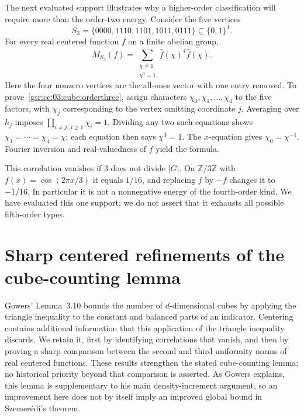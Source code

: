 \documentclass[11pt,letterpaper]{article}
\numberwithin{equation}{section}
\theoremstyle{definition}
\theoremstyle{remark}
\newcommand{\Z}{\mathbb Z}
\newcommand{\1}{\mathbf 1}
\newcommand{\srctag}[1]{\texorpdfstring{\enspace\textup{[#1]}}{ [#1]}}
\newcommand{\srcnote}[2]{\par\noindent{\small\textit{Source #1, delivered #2.}}\par}
\begin{document}
The next evaluated support illustrates why a higher-order classification
will require more than the order-two energy. Consider the five vertices
\[
 S_3=\{0000,1110,1101,1011,0111\}\subseteq\{0,1\}^4.
\]
For every real centered function $f$ on a finite abelian group,
\begin{equation}
 M_{S_3}(f)=
 \sum_{\substack{\chi\ne1\\\chi^3=1}}
                  \widehat f(\chi)^4\overline{\widehat f(\chi)}.
 \label{gsr:cc:03:cube:orderthree}
\end{equation}
Here the four nonzero vertices are the all-ones vector with one entry
removed. To prove~\eqref{gsr:cc:03:cube:orderthree}, assign characters
$\chi_0,\chi_1,\ldots,\chi_4$ to the five factors, with $\chi_j$
corresponding to the vertex omitting coordinate $j$. Averaging over
$h_j$ imposes $\prod_{i\ne j,\ i\ge1}\chi_i=1$. Dividing any two
such equations shows $\chi_1=\cdots=\chi_4=\chi$; each equation then
says $\chi^3=1$. The $x$-equation gives $\chi_0=\chi^{-1}$.
Fourier inversion and real-valuedness of $f$ yield the formula.

This correlation vanishes if $3$ does not divide $|G|$. On $\Z/3\Z$
with $f(x)=\cos(2\pi x/3)$ it equals $1/16$, and replacing $f$ by
$-f$ changes it to $-1/16$. In particular it is not a nonnegative
energy of the fourth-order kind. We have evaluated this one support;
we do not assert that it exhausts all possible fifth-order types.

\section[{Sharp centered refinements of the cube-counting lemma\srctag{04}}]{Sharp centered refinements of the cube-counting lemma}\label{gsr:cc:04:sec:d6}
\srcnote{04}{Section 6}
\label{gsr:cc:04:cub:section}

Gowers' Lemma~3.10 bounds the number of $d$-dimensional cubes by applying
the triangle inequality to the constant and balanced parts of an indicator.
Centering contains additional information that this application of the
triangle inequality discards. We retain it, first by identifying correlations
that vanish, and then by proving a sharp comparison between the second and
third uniformity norms of real centered functions. These results strengthen
the stated cube-counting lemma; no historical priority beyond that comparison
is asserted. As Gowers explains, this lemma is supplementary to his main
density-increment argument, so an improvement here does not by itself imply
an improved global bound in Szemer\'edi's theorem.
\end{document}
